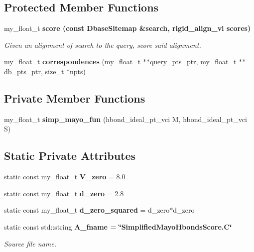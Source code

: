 \subsection*{Protected Member Functions}
\begin{CompactItemize}
\item 
my\_\-float\_\-t \bf{score} (const \bf{Dbase\-Sitemap} \&search, rigid\_\-align\_\-vi scores)
\begin{CompactList}\small\item\em Given an alignment of search to the query, score said alignment. \item\end{CompactList}\item 
my\_\-float\_\-t \textbf{correspondences} (my\_\-float\_\-t $\ast$$\ast$query\_\-pts\_\-ptr, my\_\-float\_\-t $\ast$$\ast$db\_\-pts\_\-ptr, size\_\-t $\ast$npts)\label{classSimSite3D_1_1SimplifiedMayoHbondsScore_16a1511418e1434b8a9af2a4a45771fd}

\end{CompactItemize}
\subsection*{Private Member Functions}
\begin{CompactItemize}
\item 
my\_\-float\_\-t \textbf{simp\_\-mayo\_\-fun} (hbond\_\-ideal\_\-pt\_\-vci M, hbond\_\-ideal\_\-pt\_\-vci S)\label{classSimSite3D_1_1SimplifiedMayoHbondsScore_98ffd12659a057084f2156f72ba62e98}

\end{CompactItemize}
\subsection*{Static Private Attributes}
\begin{CompactItemize}
\item 
static const my\_\-float\_\-t \textbf{V\_\-zero} = 8.0\label{classSimSite3D_1_1SimplifiedMayoHbondsScore_7fbedaf8d613548425a7927950ca6499}

\item 
static const my\_\-float\_\-t \textbf{d\_\-zero} = 2.8\label{classSimSite3D_1_1SimplifiedMayoHbondsScore_484beeed25a3dc66b615b45b965b4034}

\item 
static const my\_\-float\_\-t \textbf{d\_\-zero\_\-squared} = d\_\-zero$\ast$d\_\-zero\label{classSimSite3D_1_1SimplifiedMayoHbondsScore_ec8144f93af7dc412e9f1a8eec9871cd}

\item 
static const std::string \bf{A\_\-fname} = \char`\"{}Simplified\-Mayo\-Hbonds\-Score.C\char`\"{}\label{classSimSite3D_1_1SimplifiedMayoHbondsScore_f94c16b357f8c124b7dd01eb297ee0f0}

\begin{CompactList}\small\item\em Source file name. \item\end{CompactList}\end{CompactItemize}
